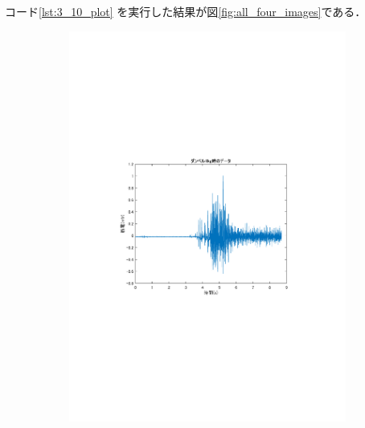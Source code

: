 \documentclass[dvipdfmx, titlepage, t]{jsarticle}
\begin{document}
    \begin{program}[H]
        \caption{筋電データの読み込みと描画}
        \inputminted[linenos,
        firstline=1,
        lastline=29,
        frame=lines,
        fontsize=\small]{matlab}{code/Exp3_10_Matlab.m}
        \label{lst:3_10_plot}
    \end{program}


    コード\ref{lst:3_10_plot} を実行した結果が図\ref{fig:all_four_images}である．

    \begin{figure}[H] %
    \centering %

    \begin{subfigure}[b]{0.48\linewidth} %
        \centering
        \includegraphics[trim=90 250 100 250 clip,width=\linewidth]{figure/data_1kg.pdf} %

\end{subfigure}
\end{figure}
\end{document}
